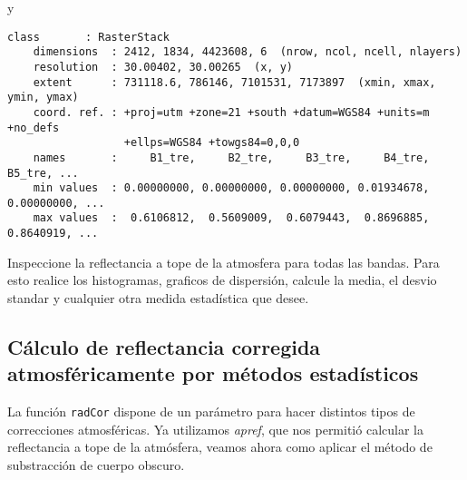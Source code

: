 \begin{exa}
    y

    \begin{Verbatim}[fontsize=\small]
    class       : RasterStack
    dimensions  : 2412, 1834, 4423608, 6  (nrow, ncol, ncell, nlayers)
    resolution  : 30.00402, 30.00265  (x, y)
    extent      : 731118.6, 786146, 7101531, 7173897  (xmin, xmax, ymin, ymax)
    coord. ref. : +proj=utm +zone=21 +south +datum=WGS84 +units=m +no_defs
                  +ellps=WGS84 +towgs84=0,0,0
    names       :     B1_tre,     B2_tre,     B3_tre,     B4_tre,     B5_tre, ...
    min values  : 0.00000000, 0.00000000, 0.00000000, 0.01934678, 0.00000000, ...
    max values  :  0.6106812,  0.5609009,  0.6079443,  0.8696885,  0.8640919, ...
    \end{Verbatim}

    \end{exa}

\begin{act}
    Inspeccione la reflectancia a tope de la atmosfera para todas las bandas.
    Para esto realice los histogramas, graficos de dispersi\'on, calcule la media,
    el desvio standar y cualquier otra medida estad\'istica que desee.
\end{act}
\subsection{C\'alculo de reflectancia corregida atmosf\'ericamente por m\'etodos
            estad\'isticos}

La funci\'on \texttt{radCor} dispone de un par\'ametro para hacer distintos
tipos de correcciones atmosf\'ericas. Ya utilizamos \emph{apref}, que nos permiti\'o
calcular la reflectancia a tope de la atm\'osfera, veamos ahora como aplicar el m\'etodo
de substracci\'on de cuerpo obscuro.


